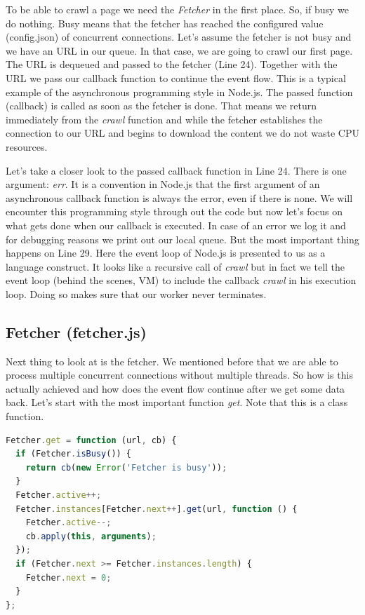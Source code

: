 To be able to crawl a page we need the \emph{Fetcher} in the first place. So, if busy we do nothing. Busy means that the fetcher has reached the configured value (config.json) of concurrent connections.
Let's assume the fetcher is not busy and we have an URL in our queue. In that case, we are going to crawl our first page. The URL is dequeued and passed to the fetcher (Line 24). Together with the URL we pass our callback function to continue the event flow. This is a typical example of the asynchronous programming style in Node.js. The passed function (callback) is called as soon as the fetcher is done. That means we return immediately from the \emph{crawl} function and while the fetcher establishes the connection to our URL and begins to download the content we do not waste CPU resources. 

Let's take a closer look to the passed callback function in Line 24. There is one argument: \emph{err}. It is a convention in Node.js that the first argument of an asynchronous callback function is always the error, even if there is none. We will encounter this programming style through out the code but now let's focus on what gets done when our callback is executed. In case of an error we log it and for debugging reasons we print out our local queue. But the most important thing happens on Line 29. Here the event loop of Node.js is presented to us as a language construct. It looks like a recursive call of \emph{crawl} but in fact we tell the event loop (behind the scenes, VM) to include the callback \emph{crawl} in his execution loop. Doing so makes sure that our worker never terminates.

\subsection{Fetcher (fetcher.js)}
Next thing to look at is the fetcher. We mentioned before that we are able to process multiple concurrent connections without multiple threads. So how is this actually achieved and how does the event flow continue after we get some data back.
Let's start with the most important function \emph{get}. Note that this is a class function.

\begin{lstlisting}[language=JavaScript]
Fetcher.get = function (url, cb) {
  if (Fetcher.isBusy()) {
    return cb(new Error('Fetcher is busy'));
  }
  Fetcher.active++;
  Fetcher.instances[Fetcher.next++].get(url, function () {
    Fetcher.active--;
    cb.apply(this, arguments);
  });
  if (Fetcher.next >= Fetcher.instances.length) {
    Fetcher.next = 0;
  }
};
\end{lstlisting}

